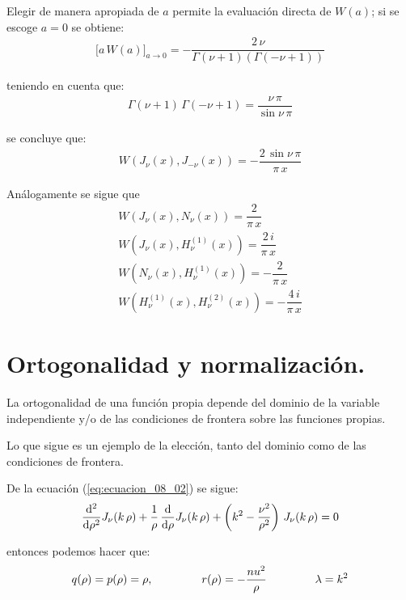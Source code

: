 Elegir de manera apropiada de $a$ permite la evaluación directa de $W(a)$; si se escoge $a = 0$ se obtiene:
\begin{align*}
\bigg[a \, W(a) \bigg]_{a \to 0} =  - \dfrac{2 \, \nu}{\Gamma(\nu + 1)(\Gamma (-\nu +1))}
\end{align*}

teniendo en cuenta que:
\begin{align*}
\Gamma (\nu + 1) \, \Gamma (-\nu + 1) = \dfrac{\nu \, \pi}{\sin \nu \,\pi }
\end{align*}

se concluye que:
\begin{align*}
W (J_{\nu} (x), J_{-\nu} (x)) = - \dfrac{2 \, \sin \nu \, \pi}{\pi \, x}
\end{align*}

Análogamente se sigue que
\begin{align*}
W (J_{\nu} (x), N_{\nu} (x)) = \dfrac{2}{\pi \, x} \\[1em]
W (J_{\nu} (x), H_{\nu}^{(1)} (x)) =  \dfrac{2 \, i}{\pi \, x} \\[1em]
W (N_{\nu} (x), H_{\nu}^{(1)} (x)) = - \dfrac{2}{\pi \, x} \\[1em]
W (H_{\nu}^{(1)} (x), H_{\nu}^{(2)} (x)) = - \dfrac{4 \, i}{\pi \, x}
\end{align*}

\section{Ortogonalidad y normalización.}

La ortogonalidad de una función propia depende del dominio de la variable independiente y/o de las condiciones de frontera sobre las funciones propias.
\par
Lo que sigue es un ejemplo de la elección, tanto del dominio como de las condiciones de frontera.
\par
De la ecuación (\ref{eq:ecuacion_08_02}) se sigue:
\begin{align*}
\dv[2]{\rho} J_{\nu} (k \, \rho) + \dfrac{1}{\rho} \, \dv{\rho} J_{\nu} (k \, \rho) + \left( k^{2} - \dfrac{\nu^{2}}{\rho^{2}} \right) \, J_{\nu} (k \, \rho) = 0
\end{align*}

entonces podemos hacer que:
\begin{align*}
q(\rho) = p(\rho) = \rho, \hspace{1.5cm} r(\rho) = -\dfrac{nu^{2}}{\rho} \hspace{1.5cm} \lambda = k^{2}
\end{align*}

